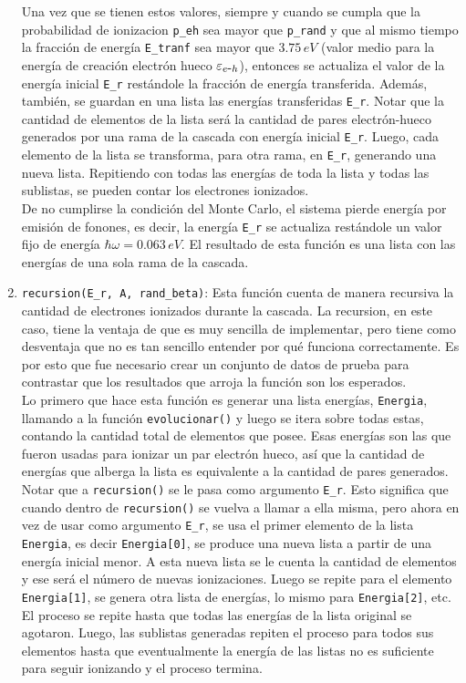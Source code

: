 \begin{enumerate}[label=\arabic*., listparindent=1.5em]
    \indent Una vez que se tienen estos valores, siempre y cuando se cumpla que la probabilidad de ionizacion \verb|p_eh| sea mayor que \verb|p_rand| y que al mismo tiempo la fracción de energía \verb|E_tranf| sea mayor que $3.75\,\si{eV}$ (valor medio para la energía de creación electrón hueco $\varepsilon_{e\mbox{-}h}$), entonces se actualiza el valor de la energía inicial \verb|E_r| restándole la fracción de energía transferida. Además, también, se guardan en una lista las energías transferidas \verb|E_r|. Notar que la cantidad de elementos de la lista será la cantidad de pares electrón-hueco generados por una rama de la cascada con energía inicial \verb|E_r|. Luego, cada elemento de la lista se transforma, para otra rama, en \verb|E_r|, generando una nueva lista. Repitiendo con todas las energías de toda la lista y todas las sublistas, se pueden contar los electrones ionizados.\\
    \indent De no cumplirse la condición del Monte Carlo, el sistema pierde energía por emisión de fonones, es decir, la energía \verb|E_r| se actualiza restándole un valor fijo de energía $\hbar \omega = 0.063\,\si{eV}$. El resultado de esta función es una lista con las energías de una sola rama de la cascada.
    \item \verb|recursion(E_r, A, rand_beta)|: Esta función cuenta de manera recursiva la cantidad de electrones ionizados durante la cascada. La recursion, en este caso, tiene la ventaja de que es muy sencilla de implementar, pero tiene como desventaja que no es tan sencillo entender por qué funciona correctamente. Es por esto que fue necesario crear un conjunto de datos de prueba para contrastar que los resultados que arroja la función son los esperados.\\
    \indent Lo primero que hace esta función es generar una lista energías, \verb|Energia|, llamando a la función \verb|evolucionar()| y luego se itera sobre todas estas, contando la cantidad total de elementos que posee. Esas energías son las que fueron usadas para ionizar un par electrón hueco, así que la cantidad de energías que alberga la lista es equivalente a la cantidad de pares generados. Notar que a \verb|recursion()| se le pasa como argumento \verb|E_r|. Esto significa que cuando dentro de \verb|recursion()| se vuelva a llamar a ella misma, pero ahora en vez de usar como argumento \verb|E_r|, se usa el primer elemento de la lista \verb|Energia|, es decir \verb|Energia[0]|, se produce una nueva lista a partir de una energía inicial menor. A esta nueva lista se le cuenta la cantidad de elementos y ese será el número de nuevas ionizaciones. Luego se repite para el elemento \verb|Energia[1]|, se genera otra lista de energías, lo mismo para \verb|Energia[2]|, etc. El proceso se repite hasta que todas las energías de la lista original se agotaron. Luego, las sublistas generadas repiten el proceso para todos sus elementos hasta que eventualmente la energía de las listas no es suficiente para seguir ionizando y el proceso termina.\\

\end{enumerate}
